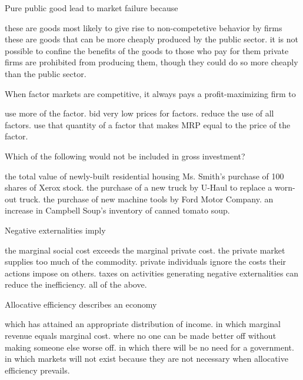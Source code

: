 \begin{questions}
  \question[2] Pure public good lead to market failure because
  \begin{choices}
    \choice these are goods most likely to give rise to
    non-competetive behavior by firms
    \choice these are goods that can be more cheaply produced by the
    public sector.
    \CorrectChoice it is not possible to confine the benefits of the
    goods to those who pay for them
    \choice private firms are prohibited from producing them, though
    they could do so more cheaply than the public sector.
  \end{choices}
 
  \question[2] When factor markets are competitive, it always pays a
  profit-maximizing firm to
  \begin{choices}
    \choice use more of the factor.
    \choice bid very low prices for factors.
    \choice reduce the use of all factors.
    \CorrectChoice use that quantity of a factor that makes MRP equal
    to the price of the factor.
  \end{choices}

  
  \question[2] Which of the following would not be included in gross
  investment?
  \begin{choices}
    \choice the total value of newly-built residential housing
    \CorrectChoice Ms. Smith's purchase of 100 shares of Xerox stock.
    \choice the purchase of a new truck by U-Haul to replace a
    worn-out truck.
    \choice the purchase of new machine tools by Ford Motor Company.
    \choice an increase in Campbell Soup's inventory of canned tomato
    soup.
  \end{choices}
  
  \question[2] Negative externalities imply
  \begin{choices}
    \choice the marginal social cost exceeds the marginal private
    cost.
    \choice the private market supplies too much of the commodity.
    \choice private individuals ignore the costs their actions impose
    on others.
    \choice taxes on activities generating negative externalities can
    reduce the inefficiency.
    \CorrectChoice all of the above.
  \end{choices}

  \question[2] Allocative efficiency describes an economy
  \begin{choices}
    \choice which has attained an appropriate distribution of income.
    \choice in which marginal revenue equals marginal cost.
    \CorrectChoice where no one can be made better off without making
    someone else worse off.
    \choice in which there will be no need for a government.
    \choice in which markets will not exist because they are not
    necessary when allocative efficiency prevails.
  \end{choices}


\end{questions}
